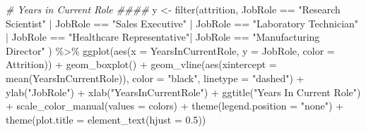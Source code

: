 \documentclass[
]{article}
\newenvironment{Shaded}{\begin{snugshade}}{\end{snugshade}}
\newcommand{\AttributeTok}[1]{\textcolor[rgb]{0.77,0.63,0.00}{#1}}
\newcommand{\CommentTok}[1]{\textcolor[rgb]{0.56,0.35,0.01}{\textit{#1}}}
\newcommand{\FloatTok}[1]{\textcolor[rgb]{0.00,0.00,0.81}{#1}}
\newcommand{\FunctionTok}[1]{\textcolor[rgb]{0.00,0.00,0.00}{#1}}
\newcommand{\NormalTok}[1]{#1}
\newcommand{\OtherTok}[1]{\textcolor[rgb]{0.56,0.35,0.01}{#1}}
\newcommand{\SpecialCharTok}[1]{\textcolor[rgb]{0.00,0.00,0.00}{#1}}
\newcommand{\StringTok}[1]{\textcolor[rgb]{0.31,0.60,0.02}{#1}}
\begin{document}
\begin{Shaded}
\begin{Highlighting}[]
\CommentTok{\# Years in Current Role \#\#\#\#}
\NormalTok{y }\OtherTok{\textless{}{-}} \FunctionTok{filter}\NormalTok{(attrition, JobRole }\SpecialCharTok{==} \StringTok{"Research Scientist"} \SpecialCharTok{|}\NormalTok{ JobRole }\SpecialCharTok{==} \StringTok{"Sales Executive"}  \SpecialCharTok{|}\NormalTok{ JobRole }\SpecialCharTok{==} \StringTok{"Laboratory Technician"} \SpecialCharTok{|}\NormalTok{ JobRole }\SpecialCharTok{==} \StringTok{"Healthcare Representative"}\SpecialCharTok{|}\NormalTok{ JobRole }\SpecialCharTok{==} \StringTok{"Manufacturing Director"}\NormalTok{ ) }\SpecialCharTok{\%\textgreater{}\%}
  \FunctionTok{ggplot}\NormalTok{(}\FunctionTok{aes}\NormalTok{(}\AttributeTok{x =}\NormalTok{ YearsInCurrentRole, }\AttributeTok{y =}\NormalTok{ JobRole, }\AttributeTok{color =}\NormalTok{ Attrition)) }\SpecialCharTok{+}
  \FunctionTok{geom\_boxplot}\NormalTok{() }\SpecialCharTok{+}
  \FunctionTok{geom\_vline}\NormalTok{(}\FunctionTok{aes}\NormalTok{(}\AttributeTok{xintercept =} \FunctionTok{mean}\NormalTok{(YearsInCurrentRole)), }\AttributeTok{color =} \StringTok{"black"}\NormalTok{, }\AttributeTok{linetype =} \StringTok{"dashed"}\NormalTok{) }\SpecialCharTok{+}
  \FunctionTok{ylab}\NormalTok{(}\StringTok{"JobRole"}\NormalTok{) }\SpecialCharTok{+}
  \FunctionTok{xlab}\NormalTok{(}\StringTok{"YearsInCurrentRole"}\NormalTok{) }\SpecialCharTok{+}
  \FunctionTok{ggtitle}\NormalTok{(}\StringTok{"Years In Current Role"}\NormalTok{) }\SpecialCharTok{+}
  \FunctionTok{scale\_color\_manual}\NormalTok{(}\AttributeTok{values =}\NormalTok{ colors) }\SpecialCharTok{+}
  \FunctionTok{theme}\NormalTok{(}\AttributeTok{legend.position =} \StringTok{"none"}\NormalTok{) }\SpecialCharTok{+}
  \FunctionTok{theme}\NormalTok{(}\AttributeTok{plot.title =} \FunctionTok{element\_text}\NormalTok{(}\AttributeTok{hjust =} \FloatTok{0.5}\NormalTok{)) }


\end{Highlighting}
\end{Shaded}
\end{document}
